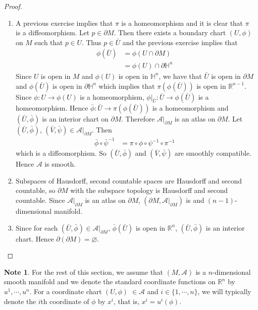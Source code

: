 \documentclass[12pt]{amsart}
\theoremstyle{definition}
\newtheorem{note}[definition]{Note}
\renewcommand{\H}{\mathbb{H}}
\newcommand{\R}{\mathbb{R}}
\newcommand{\MA}{\mathcal{A}}
\newcommand{\p}{\partial}
\begin{document}
	\begin{proof} \
		\begin{enumerate}
			\item A previous exercise implies that $\pi$ is a homeomorphism and it is clear that $\pi$ is a diffeomorphism. Let $p \in \partial M$. Then there exists a boundary chart $(U, \phi)$ on $M$ such that $p \in U$. Thus $p \in \bar{U}$ and the previous exercise implies that 
				\begin{align*}
				\phi(\bar{U}) 
				& = \phi (U \cap \p M) \\
				& = \phi(U) \cap \p \H^n 
			\end{align*}
			Since $U$ is open in $M$ and $\phi(U)$ is open in $\H^n$, we have that $\bar{U}$ is open in $\p M$ and $\phi(\bar{U})$ is open in $\p \H^n$ which implies that $\pi(\phi(\bar{U}))$ is open in $\R^{n-1}$. Since $\phi: U \rightarrow \phi(U)$ is a homeomorphism, $\phi|_{\bar{U}}: \bar{U} \rightarrow \phi(\bar{U})$ is a homeomorphism. Hence $\bar{\phi}: \bar{U} \rightarrow \pi(\phi(\bar{U}))$ is a homeomorphism and $(\bar{U}, \bar{\phi})$ is an interior chart on $\p M$. Therefore $\MA|_{\p M }$ is an atlas on $\p M$. Let $(\bar{U}, \bar{\phi})$, $(\bar{V}, \bar{\psi}) \in \MA|_{\p M}$. Then 
			\begin{align*}
				\bar{\phi} \circ \bar{\psi}^{-1}
				& = \pi \circ \phi \circ \psi^{-1} \circ \pi^{-1}
			\end{align*}
			which is a diffeomorphism. So $(\bar{U}, \bar{\phi})$ and $(\bar{V}, \bar{\psi})$ are smoothly compatible. Hence $\MA$ is smooth.
			\\
			\item Subspaces of Hausdorff, second countable spaces are Hausdorff and second countable, so $\p M$ with the subspace topology is Hausdorff and second countable. Since  $\MA|_{\p M }$ is an atlas on $\p M$, $(\p M,  \MA|_{\p M })$ is and $(n-1)$-dimensional manifold. \\
			\item Since for each $(\bar{U}, \bar{\phi}) \in \MA|_{\p M}$, $\bar{\phi}(\bar{U})$ is open in $\R^n$, $(\bar{U}, \bar{\phi})$ is an interior chart. Hence $\p(\p M) = \varnothing$.
		\end{enumerate}
	\end{proof}

	
	
	\begin{note}
		For the rest of this section, we assume that $(M, \MA)$ is a $n$-dimensional smooth manifold and we denote the standard coordinate functions on $\R^n$ by $u^1, \cdots, u^n$. For a coordinate chart $(U, \phi)$ $\in \MA$ and $i \in \{1, \cdots, n\}$, we will typically denote the $i$th coordinate of $\phi$ by $x^i$, that is,  $x^i = u^i(\phi)$.
	\end{note}
	
\end{document}
